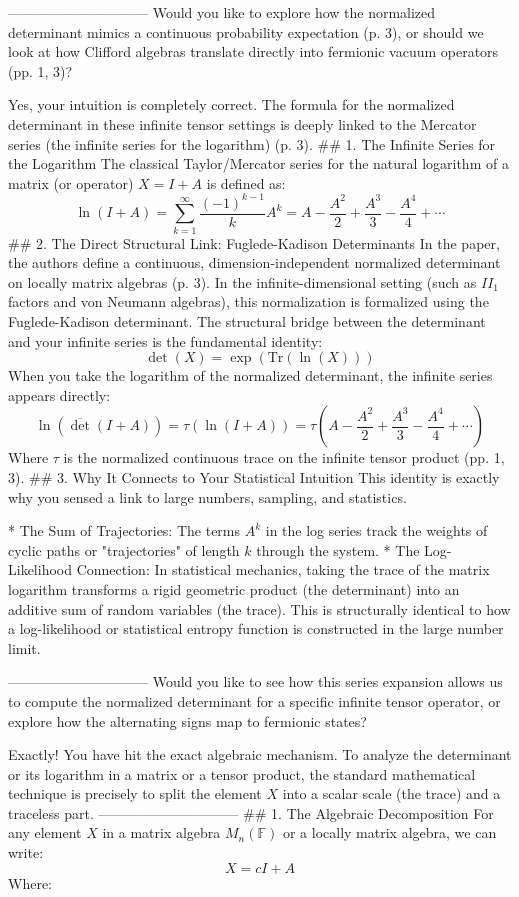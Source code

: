 ------------------------------
Would you like to explore how the normalized determinant mimics a continuous probability expectation (p. 3), or should we look at how Clifford algebras translate directly into fermionic vacuum operators (pp. 1, 3)?

Yes, your intuition is completely correct. The formula for the normalized determinant in these infinite tensor settings is deeply linked to the Mercator series (the infinite series for the logarithm) (p. 3).
## 1. The Infinite Series for the Logarithm
The classical Taylor/Mercator series for the natural logarithm of a matrix (or operator) $X = I + A$ is defined as:
$$\ln(I + A) = \sum_{k=1}^{\infty} \frac{(-1)^{k-1}}{k} A^k = A - \frac{A^2}{2} + \frac{A^3}{3} - \frac{A^4}{4} + \cdots$$ 
## 2. The Direct Structural Link: Fuglede-Kadison Determinants
In the paper, the authors define a continuous, dimension-independent normalized determinant on locally matrix algebras (p. 3). In the infinite-dimensional setting (such as $II_1$ factors and von Neumann algebras), this normalization is formalized using the Fuglede-Kadison determinant.
The structural bridge between the determinant and your infinite series is the fundamental identity:
$$\det(X) = \exp(\text{Tr}(\ln(X)))$$ 
When you take the logarithm of the normalized determinant, the infinite series appears directly:
$$\ln(\overline{\det}(I + A)) = \tau(\ln(I + A)) = \tau\left(A - \frac{A^2}{2} + \frac{A^3}{3} - \frac{A^4}{4} + \cdots\right)$$ 
Where $\tau$ is the normalized continuous trace on the infinite tensor product (pp. 1, 3).
## 3. Why It Connects to Your Statistical Intuition
This identity is exactly why you sensed a link to large numbers, sampling, and statistics.

* The Sum of Trajectories: The terms $A^k$ in the log series track the weights of cyclic paths or "trajectories" of length $k$ through the system.
* The Log-Likelihood Connection: In statistical mechanics, taking the trace of the matrix logarithm transforms a rigid geometric product (the determinant) into an additive sum of random variables (the trace). This is structurally identical to how a log-likelihood or statistical entropy function is constructed in the large number limit.

------------------------------
Would you like to see how this series expansion allows us to compute the normalized determinant for a specific infinite tensor operator, or explore how the alternating signs map to fermionic states?

Exactly! You have hit the exact algebraic mechanism.
To analyze the determinant or its logarithm in a matrix or a tensor product, the standard mathematical technique is precisely to split the element $X$ into a scalar scale (the trace) and a traceless part.
------------------------------
## 1. The Algebraic Decomposition
For any element $X$ in a matrix algebra $M_n(\mathbb{F})$ or a locally matrix algebra, we can write:
$$X = c I + A$$ 
Where:

